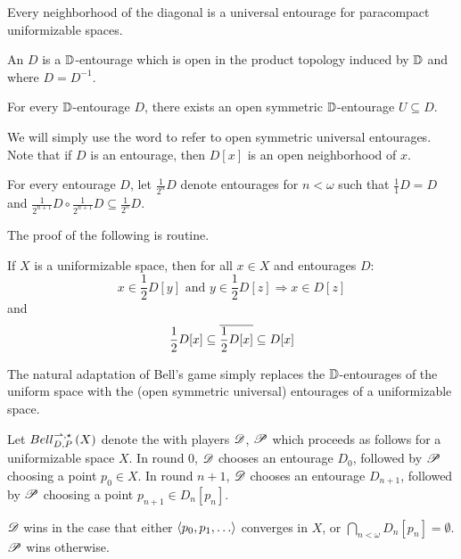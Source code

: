 \begin{thm}
  Every neighborhood of the diagonal is a universal entourage for
  paracompact uniformizable spaces.
\end{thm}

\begin{defn}
  An  $D$ is a $\mathbb{D}$-entourage
  which is open in the product topology induced by $\mathbb{D}$ and where
  $D=D^{-1}$.
\end{defn}

\begin{thm}
  For every $\mathbb{D}$-entourage $D$, there exists an open symmetric
  $\mathbb{D}$-entourage $U\subseteq D$.
\end{thm}

We will simply use the word  to refer to open symmetric
universal entourages. Note that if $D$ is an
entourage, then $D[x]$ is an open neighborhood of $x$.

\begin{defn}
  For every entourage $D$, let $\frac{1}{2^n}D$ denote entourages for $n<\omega$
  such that $\frac{1}{1}D=D$ and
  $\frac{1}{2^{n+1}}D\circ\frac{1}{2^{n+1}}D\subseteq\frac{1}{2^n}D$.
\end{defn}

The proof of the following is routine.

\begin{prop}
  If $X$ is a uniformizable space, then for all $x\in X$ and
  entourages $D$:
    \[
      x\in \frac{1}{2}D[y]\text{ and } y\in\frac{1}{2}D[z] \Rightarrow x\in D[z]
    \]
  and
    \[
      \frac{1}{2}D[x]\subseteq \overline{\frac{1}{2}D[x]}\subseteq D[x]
    \]
\end{prop}


The natural adaptation of Bell's game simply replaces the $\mathbb{D}$-entourages
of the uniform space with the (open symmetric universal) entourages of
a uniformizable space.

\begin{game}
  Let $Bell_{D,P}^{\rightharpoonup,\star}\left({X}\right)$ denote the  with
  players $\mathscr{D}$, $\mathscr{P}$ which proceeds as follows for
  a uniformizable space $X$. In round $0$,
  $\mathscr{D}$ chooses an entourage $D_0$, followed by $\mathscr{P}$
  choosing a point $p_0\in X$. In round $n+1$, $\mathscr{D}$ chooses an entourage
  $D_{n+1}$, followed by $\mathscr{P}$ choosing a point $p_{n+1}\in D_n[p_n]$.

  $\mathscr{D}$ wins in the case that either $\<p_0,p_1,\dots\>$ converges in $X$,
  or $\bigcap_{n<\omega}D_n[p_n] = \emptyset$. $\mathscr{P}$ wins otherwise.
\end{game}

